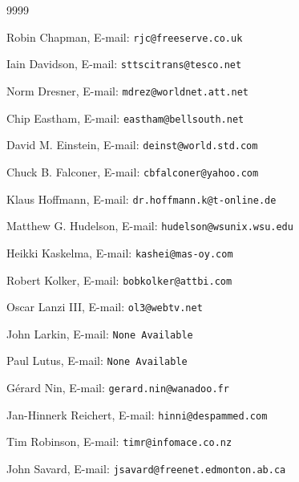 \begin{thecustombibliography}{9999}

Robin Chapman,
E-mail: \texttt{rjc@freeserve.co.uk}

Iain Davidson,
E-mail: \texttt{sttscitrans@tesco.net}

Norm Dresner,
E-mail: \texttt{mdrez@worldnet.att.net}

Chip Eastham,
E-mail: \texttt{eastham@bellsouth.net}

David M. Einstein,
E-mail: \texttt{deinst@world.std.com}

Chuck B. Falconer,
E-mail: \texttt{cbfalconer@yahoo.com}

Klaus Hoffmann,
E-mail: \texttt{dr.hoffmann.k@t-online.de}

Matthew G. Hudelson,
E-mail: \texttt{hudelson@wsunix.wsu.edu}

Heikki Kaskelma,
E-mail: \texttt{kashei@mas-oy.com}

Robert Kolker,
E-mail: \texttt{bobkolker@attbi.com}

Oscar Lanzi III,
E-mail: \texttt{ol3@webtv.net}

John Larkin,
E-mail: \texttt{None Available}

Paul Lutus,
E-mail: \texttt{None Available}

G\'erard Nin,
E-mail: \texttt{gerard.nin@wanadoo.fr}

Jan-Hinnerk Reichert,
E-mail: \texttt{hinni@despammed.com}

Tim Robinson,
E-mail: \texttt{timr@infomace.co.nz}

John Savard,
E-mail: \texttt{jsavard@freenet.edmonton.ab.ca}


\end{thecustombibliography}
